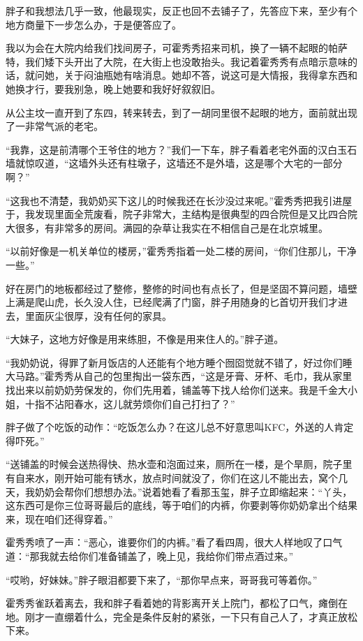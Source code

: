 胖子和我想法几乎一致，他最现实，反正也回不去铺子了，先答应下来，至少有个地方商量下一步怎么办，于是便答应了。

我以为会在大院内给我们找间房子，可霍秀秀招来司机，换了一辆不起眼的帕萨特，我们矮下头开出了大院，在大街上也没敢抬头。我记着霍秀秀有点暗示意味的话，就问她，关于闷油瓶她有啥消息。她却不答，说这可是大情报，我得拿东西和她换才行，要我别急，晚上她要和我好好叙叙旧。

从公主坟一直开到了东四，转来转去，到了一胡同里很不起眼的地方，面前就出现了一非常气派的老宅。

“我靠，这是前清哪个王爷住的地方？”我们一下车，胖子看着老宅外面的汉白玉石墙就惊叹道，“这墙外头还有柱墩子，这墙还不是外墙，这是哪个大宅的一部分啊？”

“这我也不清楚，我奶奶买下这儿的时候我还在长沙没过来呢。”霍秀秀把我引进屋于，我发现里面全荒废看，院子非常大，主结构是很典型的四合院但是又比四合院大很多，有非常多的房间。满园的杂草让我实在不相信自己是在北京城里。

“以前好像是一机关单位的楼房，”霍秀秀指着一处二楼的房间，“你们住那儿，干净一些。”

好在房门的地板都经过了整修，整修的时间也有点长了，但是坚固不算问题，墙壁上满是爬山虎，长久没人住，已经爬满了门窗，胖子用随身的匕首切开我们才进去，里面灰尘很厚，没有任何的家具。

“大妹子，这地方好像是用来练胆，不像是用来住人的。”胖子道。

“我奶奶说，得罪了新月饭店的人还能有个地方睡个囫囵觉就不错了，好过你们睡大马路。”霍秀秀从自己的包里掏出一袋东西，“这是牙膏、牙杯、毛巾，我从家里找出来以前奶奶劳保发的，你们先用着，铺盖等下找人给你们送来。我是千金大小姐，十指不沾阳春水，这儿就劳烦你们自己打扫了？”

胖子做了个吃饭的动作：“吃饭怎么办？在这儿总不好意思叫KFC，外送的人肯定得吓死。”

“送铺盖的时候会送热得快、热水壶和泡面过来，厕所在一楼，是个旱厕，院子里有自来水，刚开始可能有锈水，放点时间就没了，你们在这儿不能出去，窝个几天，我奶奶会帮你们想想办法。”说着她看了看那玉玺，胖子立即缩起来：“丫头，这东西可是你三位哥哥最后的底线，等于咱们的内裤，你要剥等你奶奶拿出个结果来，现在咱们还得穿着。”

霍秀秀喷了一声：“恶心，谁要你们的内裤。”看了看四周，很大人样地叹了口气道：“那我就去给你们准备铺盖了，晚上见，我给你们带点酒过来。”

“哎哟，好妹妹。”胖子眼泪都要下来了，“那你早点来，哥哥我可等着你。”

霍秀秀雀跃着离去，我和胖子看着她的背影离开关上院门，都松了口气，瘫倒在地。刚才一直绷着什么，完全是条件反射的紧张，一下只有自己人了，才真正放松下来。


